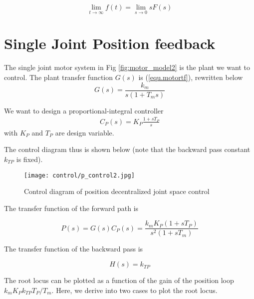 \documentclass[10pt]{article}
\begin{document}
$$
\lim_{t\rightarrow\infty}f(t)=\lim_{s\rightarrow 0}sF(s)
$$






\section{Single Joint Position feedback}
The single joint motor system in Fig \ref{fig:motor_model2} is the plant we want to control. The plant transfer function $G(s)$ is (\ref{equ.motortf}), rewritten below
$$
G(s)=\frac{k_m}{s(1+T_ms)}
$$




We want to design a  proportional-integral controller 
$$
\begin{gathered}
C_{P}(s)=K_{P} \frac{1+s T_{P}}{s} 
\end{gathered}
$$
with $K_P$ and $T_P$ are design variable.

The control  diagram thus is shown below (note that the backward pass constant $k_{TP}$ is fixed).
\begin{figure}[H]
    \centering
    \texttt{[image: control/p\_control2.jpg]}
    \caption{Control diagram of position decentralized joint space control}
    \label{fig.p_control}
\end{figure}


The transfer function of the forward path is

$$
P(s)=G(s)C_P(s)=\frac{k_{m} K_{P}\left(1+s T_{P}\right)}{s^{2}\left(1+s T_{m}\right)}
$$

The transfer function of the backward pass is

$$
H(s)=k_{T P}
$$

The root locus  can be plotted as a function of the gain of the position loop $k_{m} K_{P} k_{T P} T_{P} / T_{m}$. Here, we derive into two cases to plot the root locus.
\end{document}
